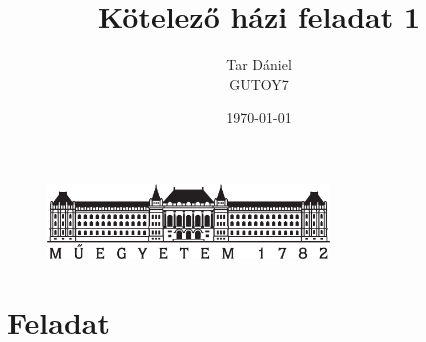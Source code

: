 \documentclass{article}
\begin{document}
	
	\begin{titlepage}
		\setlength{\headheight}{20pt}
		\title{\huge Kötelező házi feladat 1
		}
		\author{Tar Dániel\\GUTOY7}
		\date{\today}
		\maketitle
		\thispagestyle{fancy}
		
		\begin{figure}
			\begin{center}
				\includegraphics[height=2cm]{logo_bme_kicsi.eps}
			\end{center}
		\end{figure}
		
	\end{titlepage}
	\newpage

	 
	\newpage
	
	
	\setlength{\headheight}{0pt}
	\tableofcontents
	\newpage
	
	\setcounter{page}{1}

	
	
	

	
	\section{Feladat}
	
\end{document}
